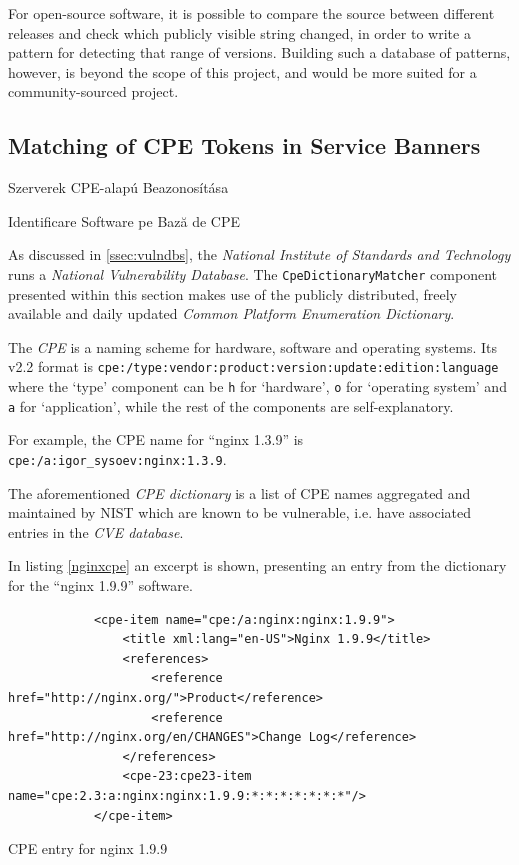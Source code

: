 \documentclass[a4paper,12pt]{article}
\newcommand\subsectionhu[1]{\addcontentsline{toc.hu}{subsection} {\protect\numberline{\thesubsection} #1}}
\newcommand\subsectionro[1]{\addcontentsline{toc.ro}{subsection} {\protect\numberline{\thesubsection} #1}}
\begin{document}
	For open-source software, it is possible to compare the source between different releases and check which publicly visible string changed, in order to write a pattern for detecting that range of versions. Building such a database of patterns, however, is beyond the scope of this project, and would be more suited for a community-sourced project.
	
\subsection{Matching of CPE Tokens in Service Banners} \label{ssec:matchcpe}
\subsectionhu{Szerverek CPE-alapú Beazonosítása} \subsectionro{Identificare Software pe Bază de CPE}

	As discussed in \ref{ssec:vulndbs}, the \textit{National Institute of Standards and Technology} runs a \textit{National Vulnerability Database}. The \texttt{CpeDictionaryMatcher} component presented within this section makes use of the publicly distributed, freely available and daily updated \textit{Common Platform Enumeration Dictionary}.
	
	The \textit{CPE} is a naming scheme for hardware, software and operating systems\cite{cpe22}. Its v2.2 format is \texttt{cpe:/type:vendor:product:version:update:edition:language} where the `type' component can be \texttt{h} for `hardware', \texttt{o} for `operating system' and \texttt{a} for `application', while the rest of the components are self-explanatory.
	
	For example, the CPE name for ``nginx 1.3.9'' is \texttt{cpe:/a:igor_sysoev:nginx:1.3.9}.
	
	The aforementioned \textit{CPE dictionary} is a list of CPE names aggregated and maintained by NIST which are known to be vulnerable, i.e. have associated entries in the \textit{CVE database}.
	
	In listing \ref{nginxcpe} an excerpt is shown, presenting an entry from the dictionary for the ``nginx 1.9.9'' software.
	
	\begin{listing}[H]
		\begin{verbatim}
			<cpe-item name="cpe:/a:nginx:nginx:1.9.9">
				<title xml:lang="en-US">Nginx 1.9.9</title>
				<references>
					<reference href="http://nginx.org/">Product</reference>
					<reference href="http://nginx.org/en/CHANGES">Change Log</reference>
				</references>
				<cpe-23:cpe23-item name="cpe:2.3:a:nginx:nginx:1.9.9:*:*:*:*:*:*:*"/>
			</cpe-item>
		\end{verbatim}
		\caption{CPE entry for nginx 1.9.9}
		\label{nginxcpe}
	\end{listing}
	
\end{document}
